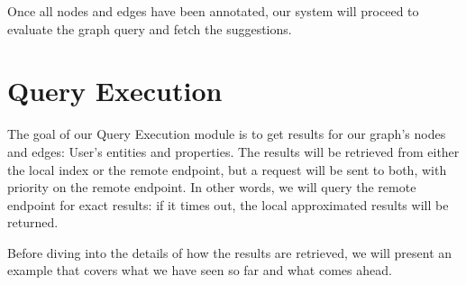 Once all nodes and edges have been annotated, our system will proceed to evaluate the graph query and fetch the suggestions. 


\section{Query Execution}
\label{chap:execution}

The goal of our Query Execution module is to get results for our graph's nodes and edges: User's entities and properties. The results will be retrieved from either the local index or the remote endpoint, but a request will be sent to both, with priority on the remote endpoint. In other words, we will query the remote endpoint for exact results: if it times out, the local approximated results will be returned.

Before diving into the details of how the results are retrieved, we will present an example that covers what we have seen so far and what comes ahead.

